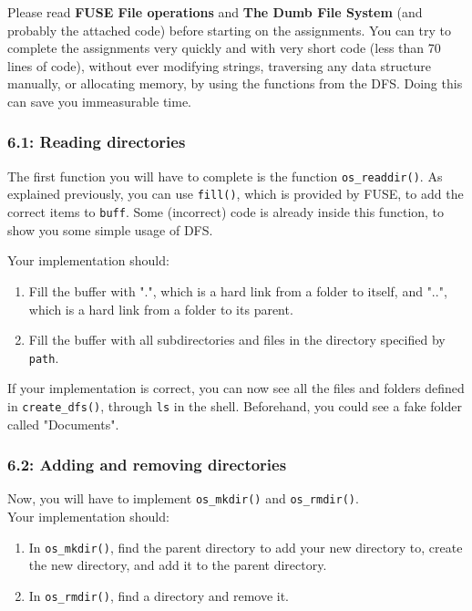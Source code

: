 \documentclass [a4,twoside,11pt] {article}
\begin{document}
    Please read \textbf{FUSE File operations} and \textbf{The Dumb File System} (and probably the attached code) before starting on the assignments. You can try to complete the assignments very quickly and with very short code (less than 70 lines of code), without ever modifying strings, traversing any data structure manually, or allocating memory, by using the functions from the DFS. Doing this can save you immeasurable time.

    \subsubsection{6.1: Reading directories}

    The first function you will have to complete is the function \texttt{os\_readdir()}. As explained previously, you can use \texttt{fill()}, which is provided by FUSE, to add the correct items to \texttt{buff}. Some (incorrect) code is already inside this function, to show you some simple usage of DFS.

    Your implementation should:

    \begin{enumerate}
        \item Fill the buffer with ".", which is a hard link from a folder to itself, and "..", which is a hard link from a folder to its parent.
        \item Fill the buffer with all subdirectories and files in the directory specified by \texttt{path}.
    \end{enumerate}

    If your implementation is correct, you can now see all the files and folders defined in \texttt{create\_dfs()}, through \texttt{ls} in the shell. Beforehand, you could see a fake folder called "Documents".

    \subsubsection{6.2: Adding and removing directories}
    
    Now, you will have to implement \texttt{os\_mkdir()} and \texttt{os\_rmdir()}.\\

    Your implementation should:

    \begin{enumerate}
        \item In \texttt{os\_mkdir()}, find the parent directory to add your new directory to, create the new directory, and add it to the parent directory.
        \item In \texttt{os\_rmdir()}, find a directory and remove it.
    \end{enumerate}
\end{document}

